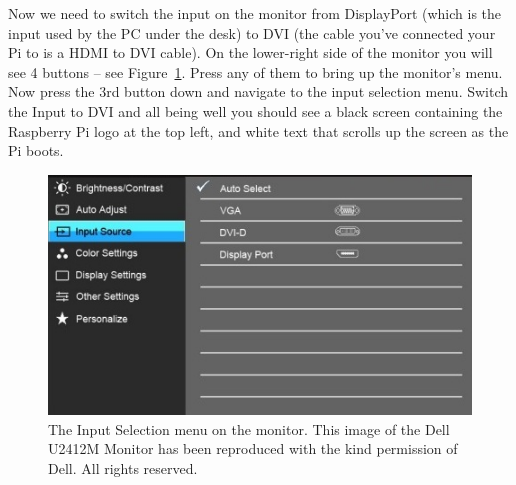 Now we need to switch the input on the monitor from DisplayPort (which
is the input used by the PC under the desk) to DVI (the cable you've
connected your Pi to is a HDMI to DVI cable). On the lower-right side
of the monitor you will see 4 buttons -- see
Figure~\ref{figure:monitorswitch}. Press any of them to bring up the
monitor's menu. Now press the 3rd button down and navigate to the
input selection menu. Switch the Input to DVI and all being well you
should see a black screen containing the Raspberry Pi logo at the top
left, and white text that scrolls up the screen as the Pi boots.

\begin{figure}
\centerline{\includegraphics[width=12cm]{images/DellInputMenu.jpg}}
\caption{The Input Selection menu on the monitor. This image  of the Dell U2412M Monitor has been reproduced with the kind permission of Dell. All rights reserved.}\label{figure:monitorswitch}
\end{figure}





